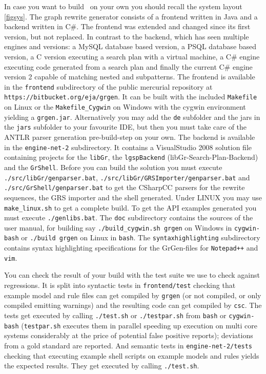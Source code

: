 In case you want to build \GrG~on your own you should recall the system layout \ref{figsys}. 
The graph rewrite generator consists of a frontend written in Java and a backend written in C\#.
The frontend was extended and changed since its first version, but not replaced.
In contrast to the backend, which has seen multiple engines and versions: a MySQL database based version, a PSQL database based version, 
a C version executing a search plan with a virtual machine, a C\# engine executing code generated from a search plan and finally the current C\# engine version 2 capable of matching nested and subpatterns.
The frontend is available in the \texttt{frontend} subdirectory of the public mercurial repository at \texttt{https://bitbucket.org/eja/grgen}.
It can be built with the included \texttt{Makefile} on Linux or the \texttt{Makefile\_Cygwin} on Windows with the cygwin environment yielding a \texttt{grgen.jar}. 
Alternatively you may add the \texttt{de} subfolder and the jars in the \texttt{jars} subfolder to your favourite IDE, but then you must take care of the ANTLR parser generation pre-build-step on your own. 
The backend is available in the \texttt{engine-net-2} subdirectory. 
It contains a VisualStudio 2008 solution file containing projects for the \texttt{libGr}, the \texttt{lgspBackend} (libGr-Search-Plan-Backend) and the \texttt{GrShell}.
Before you can build the solution you must execute \texttt{./src/libGr/genparser.bat}, \texttt{./src/libGr/GRSImporter/genparser.bat} and \texttt{./src/Gr\-Shell/genparser.bat}
to get the CSharpCC parsers for the rewrite sequences, the GRS importer and the shell generated.
Under LINUX you may use \texttt{make\_linux.sh} to get a complete build.
To get the API examples generated you must execute \texttt{./genlibs.bat}.
The \texttt{doc} subdirectory contains the sources of the user manual, for building say \texttt{./build\_cygwin.sh grgen} on Windows in \texttt{cygwin-bash} or \texttt{./build grgen} on Linux in \texttt{bash}.
The \texttt{syntaxhighlighting} subdirectory contains syntax highlighting specifications for the GrGen-files for \texttt{Notepad++} and \texttt{vim}.

You can check the result of your build with the test suite we use to check against regressions.
It is split into syntactic tests in \texttt{frontend/test} checking that example model and rule files can get compiled by \texttt{grgen} (or not compiled, or only compiled emitting warnings) and the resulting code can get compiled by \texttt{csc}.
The tests get executed by calling \texttt{./test.sh} or \texttt{./testpar.sh} from \texttt{bash} or \texttt{cygwin-bash} (\texttt{testpar.sh} executes them in parallel speeding up execution on multi core systems considerably at the price of potential false positive reports); deviations from a gold standard are reported.
And semantic tests in \texttt{engine-net-2/tests} checking that executing example shell scripts on example models and rules yields the expected results. 
They get executed by calling \texttt{./test.sh}.


